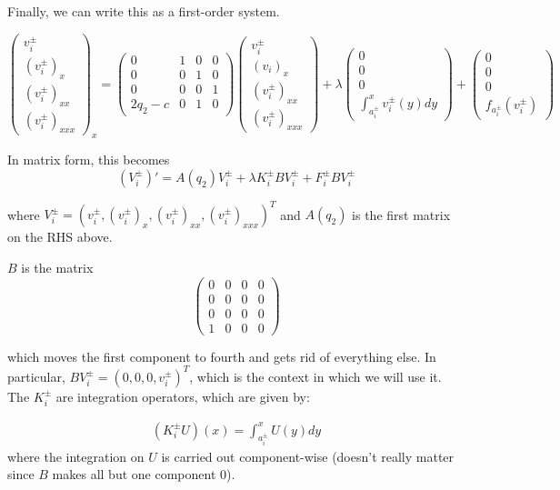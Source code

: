 \documentclass[12pt]{article}
\begin{document}
Finally, we can write this as a first-order system.

\[
\begin{pmatrix}v_i^\pm\\(v_i^\pm)_x\\(v_i^\pm)_{xx}\\(v_i^\pm)_{xxx}\end{pmatrix}_x = 
\begin{pmatrix}0 & 1 & 0 & 0 \\ 0 & 0 & 1 & 0 \\ 0 & 0 & 0 & 1 \\ 2q_2 - c & 0 & 1 & 0\end{pmatrix}
\begin{pmatrix}v_i^\pm\\(v_i)_x\\(v_i^\pm)_{xx}\\(v_i^\pm)_{xxx}\end{pmatrix} + \lambda 
\begin{pmatrix}0\\0\\0\\ \int_{a_i^\pm}^x v_i^\pm(y) dy\end{pmatrix} + 
\begin{pmatrix}0\\0\\0\\f_{a_i^\pm}(v_i^\pm)\end{pmatrix}
\]

In matrix form, this becomes
\[
(V_i^\pm)' = A(q_2) V_i^\pm + \lambda K_i^\pm B V_i^\pm + F_i^\pm B V_i^\pm
\]

where $V_i^\pm = (v_i^\pm, (v_i^\pm)_x, (v_i^\pm)_{xx}, (v_i^\pm)_{xxx})^T$ and $A(q_2)$ is the first matrix on the RHS above.

$B$ is the matrix
\[
\begin{pmatrix}0 & 0 & 0 & 0 \\0 & 0 & 0 & 0 \\0 & 0 & 0 & 0 \\1 & 0 & 0 & 0 \end{pmatrix}
\]

which moves the first component to fourth and gets rid of everything else. In particular, $B V_i^\pm = (0, 0,0, v_i^\pm)^T$, which is the context in which we will use it.\\

The $K_i^\pm$ are integration operators, which are given by:

\begin{align*}
(K_i^\pm U)(x) = \int_{a_i^\pm}^x U(y) dy
\end{align*}
where the integration on $U$ is carried out component-wise (doesn't really matter since $B$ makes all but one component 0).\\
\end{document}
